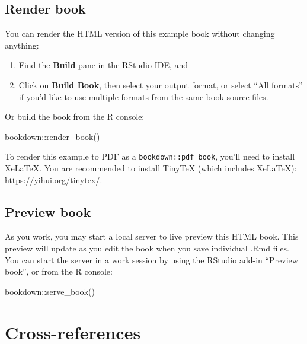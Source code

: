 \documentclass[12pt, oneside, openright]{byuthesis}
\newenvironment{Shaded}{\begin{snugshade}}{\end{snugshade}}
\newcommand{\FunctionTok}[1]{\textcolor[rgb]{0.00,0.00,0.00}{#1}}
\newcommand{\NormalTok}[1]{#1}
\newcommand{\SpecialCharTok}[1]{\textcolor[rgb]{0.00,0.00,0.00}{#1}}
\begin{document}
\hypertarget{render-book}{%
\section{Render book}\label{render-book}}

You can render the HTML version of this example book without changing anything:

\begin{enumerate}
\def\labelenumi{\arabic{enumi}.}
\item
  Find the \textbf{Build} pane in the RStudio IDE, and
\item
  Click on \textbf{Build Book}, then select your output format, or select ``All formats'' if you'd like to use multiple formats from the same book source files.
\end{enumerate}

Or build the book from the R console:

\begin{Shaded}
\begin{Highlighting}[]
\NormalTok{bookdown}\SpecialCharTok{::}\FunctionTok{render\_book}\NormalTok{()}
\end{Highlighting}
\end{Shaded}

To render this example to PDF as a \texttt{bookdown::pdf\_book}, you'll need to install XeLaTeX. You are recommended to install TinyTeX (which includes XeLaTeX): \url{https://yihui.org/tinytex/}.

\hypertarget{preview-book}{%
\section{Preview book}\label{preview-book}}

As you work, you may start a local server to live preview this HTML book. This preview will update as you edit the book when you save individual .Rmd files. You can start the server in a work session by using the RStudio add-in ``Preview book'', or from the R console:

\begin{Shaded}
\begin{Highlighting}[]
\NormalTok{bookdown}\SpecialCharTok{::}\FunctionTok{serve\_book}\NormalTok{()}
\end{Highlighting}
\end{Shaded}

\hypertarget{cross}{%
\chapter{Cross-references}\label{cross}}
\end{document}

